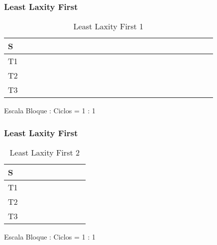\documentclass[xcolor=table]{beamer}
\begin{document}
\begin{frame} 
\frametitle{ Least Laxity First } 
\begin{table} 
\centering 
\begin{tabular}{|l|l|l|l|l|l|l|l|l|l|l|l|l|l|l|l|l|l|l|l|l|l|l|l|l|} 
\hline 
S & \cellcolor{green} & \cellcolor{green} & \cellcolor{green} & \cellcolor{green} & \cellcolor{green} & \cellcolor{green} & \cellcolor{green} & \cellcolor{green} & \cellcolor{green} & \cellcolor{green} & \cellcolor{green} & \cellcolor{green} & \cellcolor{green} & \cellcolor{green} & \cellcolor{green} & \cellcolor{green} & \cellcolor{green} & \cellcolor{green} & \cellcolor{green} & \cellcolor{green} & \cellcolor{green} & \cellcolor{green} & \cellcolor{green} & \cellcolor{green} \\ \hline 
T1 & & & & & & & & & & & & & & & & & & & & & & & & \\ \hline 
T2 & \cellcolor{red} & \cellcolor{red} & \cellcolor{red} & \cellcolor{red} & \cellcolor{red} & \cellcolor{red} & \cellcolor{red} & \cellcolor{red} & \cellcolor{red} & \cellcolor{red} & \cellcolor{red} & \cellcolor{red} & \cellcolor{red} & \cellcolor{red} & \cellcolor{red} & \cellcolor{red} & \cellcolor{red} & \cellcolor{red} & \cellcolor{red} & \cellcolor{red} & & & & \\ \hline 
T3 & & & & & & & & & & & & & & & & & & & & & \cellcolor{green} & \cellcolor{green} & \cellcolor{green} & \cellcolor{green} \\ \hline 
\end{tabular} 
\caption{ Least Laxity First 1 } 
\end{table} 
Escala Bloque : Ciclos = 1 : 1 
\end{frame} 
\begin{frame} 
\frametitle{ Least Laxity First } 
\begin{table} 
\centering 
\begin{tabular}{|l|l|l|l|l|l|l|l|l|} 
\hline 
S & \cellcolor{green} & \cellcolor{green} & \cellcolor{green} & \cellcolor{green} & \cellcolor{green} & \cellcolor{green} & \cellcolor{green} & \cellcolor{green} \\ \hline 
T1 & & \cellcolor{blue} & \cellcolor{blue} & \cellcolor{blue} & \cellcolor{blue} & \cellcolor{blue} & \cellcolor{blue} & \cellcolor{blue} \\ \hline 
T2 & & & & & & & & \\ \hline 
T3 & \cellcolor{green} & & & & & & & \\ \hline 
\end{tabular} 
\caption{ Least Laxity First 2 } 
\end{table} 
Escala Bloque : Ciclos = 1 : 1 
\end{frame} 
\end{document}
